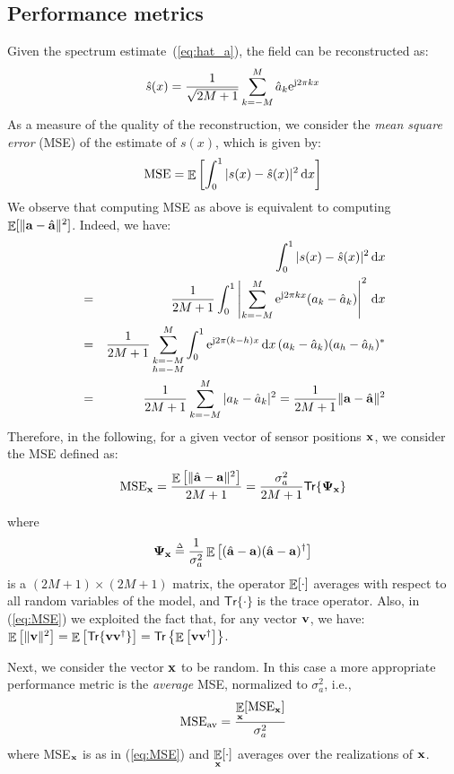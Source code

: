 \documentclass[final, a4paper]{IEEEtran}
\newcommand{\ee}{{\rm e}}
\newcommand{\jj}{{\rm j}}  \newcommand{\ii}{{\rm i}}  \newcommand{\dd}{{\rm\,d}}
\newcommand{\av}{{\bf a}}
\newcommand{\vv}{{\bf v}}
\newcommand{\xv}{{\bf x}}
\newcommand{\Psim}{\hbox{\boldmath$\Psi$}}
\def\trace{\mathsf{Tr}}
\newcommand{\eqdef}{\ensuremath{\stackrel{\mbox{\upshape\tiny $\Delta$}}{=}}}
\def\non{\nonumber\\}
\def\MSEav{{\rm MSE}_{\rm av}}
\begin{document}
\subsection{Performance metrics}
\label{sec:MSE}
Given the spectrum estimate~(\ref{eq:hat_a}), the field can be reconstructed
as:
\[ \hat{s}(x) = \frac{1}{\sqrt{2M+1}}\sum_{k=-M}^M \hat{a}_k\ee^{\jj 2 \pi k x} \]
As a measure of the quality of the reconstruction, we consider
the {\em mean square error} (MSE) of the estimate of $s(x)$, which is given by:
\[ {\rm MSE} = \EE\left[\int_0^1|s(x)-\hat{s}(x)|^2 \dd x \right] \]
We observe that computing MSE as above is equivalent to computing $\EE[\|\av - \hat{\av} \|^2]$. 
Indeed, we have:
\begin{eqnarray}
&&\int_0^1|s(x)-\hat{s}(x)|^2 \dd x \non
&=& \frac{1}{2M+1}\int_0^1\left|\sum_{k=-M}^M\ee^{\jj 2 \pi k x}(a_k-\hat{a}_k)   \right|^2 \dd x \non
&=& \frac{1}{2M+1}\sum_{\substack{k=-M\\ h=-M}}^M\int_0^1\ee^{\jj 2 \pi (k-h) x} \dd x\, (a_k-\hat{a}_k)(a_h-\hat{a}_h)^* \non
&=& \frac{1}{2M+1}\sum_{k=-M}^M  |a_k-\hat{a}_k|^2 =\frac{1}{2M+1}\|\av-\hat{\av}\|^2 \nonumber
\end{eqnarray}
Therefore, in the following, for a given vector of sensor positions $\xv$, we consider the MSE defined as:
\begin{equation}
{\rm MSE}_\xv = \frac{\EE\left[\|\hat{\av} -\av\|^2\right]}{2M+1} = \frac{\sigma^2_a}{2M+1}\trace\{\Psim_\xv\}
\label{eq:MSE}
\end{equation}

where
\begin{equation}
\Psim_\xv \eqdef \frac{1}{\sigma^2_a}\EE\left[(\hat{\av} -\av)(\hat{\av} -\av)\Herm\right]
\label{eq:Psi}
\end{equation}
is a $(2M+1)\times (2M+1)$ matrix,
the operator $\mathop{\mathbb{E}}\limits[\cdot]$ averages with respect to all random variables of the model, and
$\trace\{\cdot\}$ is the trace operator.
Also, in (\ref{eq:MSE}) we exploited the fact that, for any vector $\vv$,
we have: $\EE\left[\|\vv\|^2\right]= \EE\left[\trace\{\vv\vv\Herm\}\right]
= \trace\left\{\EE\left[\vv\vv\Herm\right]\right\}$.


Next, we consider the vector $\xv$ to be random.
In this case a more appropriate performance metric is the
{\em average} MSE, normalized to $\sigma^2_a$, i.e.,
\[ \MSEav = \frac{\EE_{\xv}[{\rm MSE_\xv}]}{\sigma^2_a} \]
where MSE$_\xv$ is as in (\ref{eq:MSE}) and $\EE_\xv[\cdot]$ averages over the realizations of $\xv$.
\end{document}
